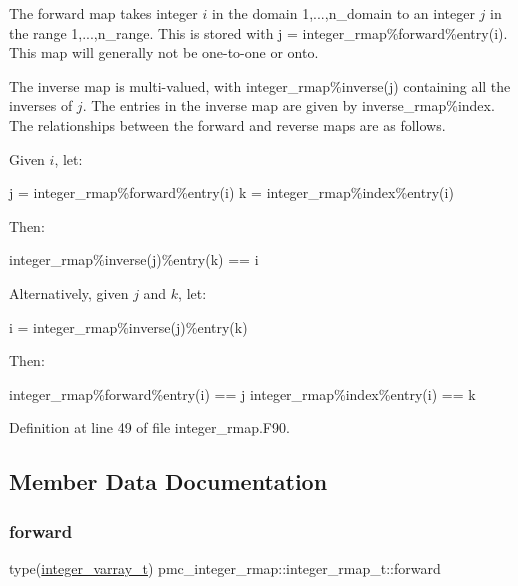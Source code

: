 The forward map takes integer $i$ in the domain 1,...,n\+\_\+domain to an integer $j$ in the range 1,...,n\+\_\+range. This is stored with {\ttfamily j = integer\+\_\+rmap\%forward\%entry(i)}. This map will generally not be one-\/to-\/one or onto.

The inverse map is multi-\/valued, with {\ttfamily integer\+\_\+rmap\%inverse(j)} containing all the inverses of $j$. The entries in the inverse map are given by {\ttfamily inverse\+\_\+rmap\%index}. The relationships between the forward and reverse maps are as follows.

Given $i$, let\+: 
\begin{DoxyPre}
 j = integer\_rmap\%forward\%entry(i)
 k = integer\_rmap\%index\%entry(i)
 \end{DoxyPre}
 Then\+: 
\begin{DoxyPre}
 integer\_rmap\%inverse(j)\%entry(k) == i
 \end{DoxyPre}


Alternatively, given $j$ and $k$, let\+: 
\begin{DoxyPre}
 i = integer\_rmap\%inverse(j)\%entry(k)
 \end{DoxyPre}
 Then\+: 
\begin{DoxyPre}
 integer\_rmap\%forward\%entry(i) == j
 integer\_rmap\%index\%entry(i) == k
 \end{DoxyPre}
 

Definition at line 49 of file integer\+\_\+rmap.\+F90.



\subsection{Member Data Documentation}
\mbox{\label{structpmc__integer__rmap_1_1integer__rmap__t_a1a1b17cd7c4ecab183cdc4d6ff4124bf}} 
\subsubsection{\texorpdfstring{forward}{forward}}
{\footnotesize\ttfamily type(\mbox{\hyperlink{structpmc__integer__varray_1_1integer__varray__t}{integer\+\_\+varray\+\_\+t}}) pmc\+\_\+integer\+\_\+rmap\+::integer\+\_\+rmap\+\_\+t\+::forward}



